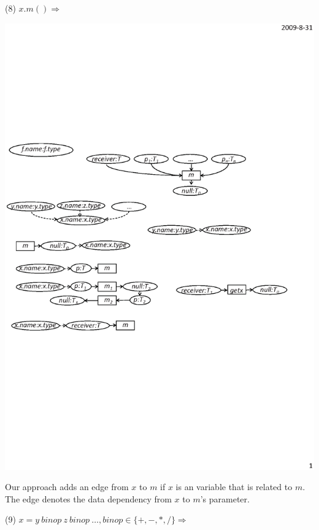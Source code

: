 (8) $x.m()\Rightarrow$
\begin{center}
\includegraphics[scale=0.7,clip]{figure/rule8.eps}%
\end{center}

Our approach adds an edge from $x$ to $m$ if $x$ is an variable that
is related to $m$. The edge denotes the data dependency from $x$ to
$m$'s parameter.

(9) $x=y\ binop\ z\ binop\ \ldots, binop\in \{+,-,*,/\} \Rightarrow
$


